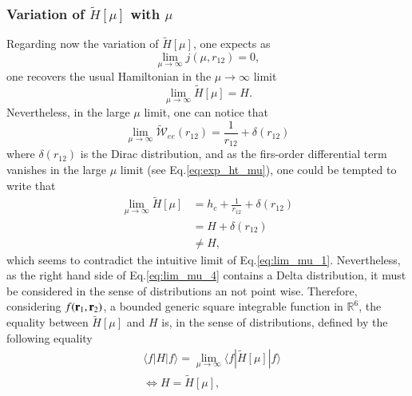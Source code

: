 \documentclass[aip,jcp,reprint,noshowkeys,superscriptaddress]{revtex4-1}
\newcommand{\matelem}[3]{\langle #1 | #2 | #3 \rangle}
\newcommand{\br}[0]{{\bf {r}}}
\newcommand{\R}{\mathbb{R}}
\begin{document}
\subsubsection{Variation of $\tilde{H}[\mu]$ with $\mu$}
\label{sec:h_mu_lim}
Regarding now the variation of $\tilde{H}[\mu]$, one expects as 
\begin{equation}
 \label{eq:lim_mu_0}
 \lim_{\mu  \rightarrow \infty }j(\mu,r_{12}) = 0, 
\end{equation}
one recovers the usual Hamiltonian in the ${\mu  \rightarrow \infty }$ limit
\begin{equation}
 \label{eq:lim_mu_1}
 \lim_{\mu \rightarrow \infty} \tilde{H}[\mu] = H.
\end{equation}
Nevertheless, in the large $\mu$ limit, one can notice that 
\begin{equation}
 \label{eq:lim_mu_3}
 \lim_{\mu \rightarrow \infty} \tilde{\mathcal{W}}_{ee}(r_{12})  = \frac{1}{r_{12}} + \delta(r_{12}) 
\end{equation}
where $\delta(r_{12})$ is the Dirac distribution, and as the firs-order differential term vanishes in the large $\mu$ limit (see Eq.\eqref{eq:exp_ht_mu}), one could be tempted to write that 
\begin{equation}
 \begin{aligned}
 \label{eq:lim_mu_4}
 \lim_{\mu \rightarrow \infty} \tilde{H}[\mu]& = h_c + \frac{1}{r_{12}} + \delta(r_{12}) \\
                                             & = H + \delta(r_{12})  \\
                                             & \ne H,
 \end{aligned}
\end{equation}
which seems to contradict the intuitive limit of Eq.\eqref{eq:lim_mu_1}. 
Nevertheless, as the right hand side of Eq.\eqref{eq:lim_mu_4} contains a Delta distribution, it must be considered in the sense of distributions an not point wise. 
Therefore, considering $f(\br{}_1,\br{}_2)$, a bounded generic square integrable function in $\R^6$, the equality between $\tilde{H}[\mu]$ and $H$ is, in the sense of distributions, defined by the following equality 
\begin{equation}
 \label{eq:lim_mu_5}
 \begin{aligned}
& \matelem{f}{H}{f} = \lim_{\mu \rightarrow \infty} \matelem{f}{\tilde{H}[\mu]}{f} \\
& \Leftrightarrow H = \tilde{H}[\mu],
 \end{aligned}
\end{equation}
\end{document}
